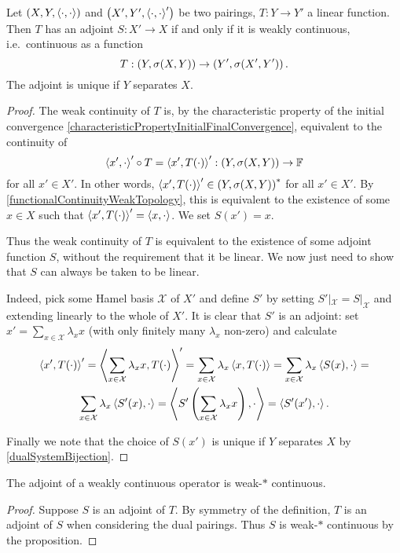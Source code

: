\begin{proposition}
Let $\left( X,Y,\left\langle \cdot,\cdot \right\rangle \right)$ and $\left( X',Y',\left\langle \cdot,\cdot \right\rangle' \right)$ be two pairings, $T: Y\to Y'$ a linear function. Then $T$ has an adjoint $S: X'\to X$ \textup{if and only if} it is weakly continuous, i.e.\ continuous as a function
\[ T: \left( Y, \sigma(X,Y) \right) \to \left( Y', \sigma(X',Y') \right). \]
The adjoint is unique if $Y$ separates $X$.
\end{proposition}
\begin{proof}
The weak continuity of $T$ is, by the characteristic property of the initial convergence \ref{characteristicPropertyInitialFinalConvergence}, equivalent to the continuity of
\[ \left\langle x', \cdot \right\rangle' \circ T = \left\langle x', T(\cdot) \right\rangle' : \left( Y, \sigma(X,Y) \right) \to \mathbb{F} \]
for all $x'\in X'$. In other words, $\left\langle x', T(\cdot) \right\rangle' \in {\left( Y, \sigma(X,Y) \right)}^*$ for all $x'\in X'$. By \ref{functionalContinuityWeakTopology}, this is equivalent to the existence of some $x\in X$ such that $\left\langle x', T(\cdot) \right\rangle' = \left\langle x,\cdot \right\rangle$. We set $S(x') = x$.

Thus the weak continuity of $T$ is equivalent to the existence of some adjoint function $S$, without the requirement that it be linear. We now just need to show that $S$ can always be taken to be linear.

Indeed, pick some Hamel basis $\mathcal{X}$ of $X'$ and define $S'$ by setting $S'|_{\mathcal{X}} = S|_{\mathcal{X}}$ and extending linearly to the whole of $X'$. It is clear that $S'$ is an adjoint: set $x' = \sum_{x\in\mathcal{X}}\lambda_x x$ (with only finitely many $\lambda_x$ non-zero) and calculate
\begin{multline*}
\left\langle x', T(\cdot) \right\rangle' = \left\langle \sum_{x\in\mathcal{X}}\lambda_x x, T(\cdot) \right\rangle' = \sum_{x\in\mathcal{X}}\lambda_x \left\langle x, T(\cdot) \right\rangle = \sum_{x\in\mathcal{X}}\lambda_x \left\langle S(x), \cdot \right\rangle = \\ \sum_{x\in\mathcal{X}}\lambda_x \left\langle S'(x), \cdot \right\rangle = \left\langle S'\left(\sum_{x\in\mathcal{X}}\lambda_x x\right), \cdot \right\rangle = \left\langle S'(x'), \cdot \right\rangle.
\end{multline*}

Finally we note that the choice of $S(x')$ is unique if $Y$ separates $X$ by \ref{dualSystemBijection}.
\end{proof}
\begin{corollary}
The adjoint of a weakly continuous operator is weak-$*$ continuous.
\end{corollary}
\begin{proof}
Suppose $S$ is an adjoint of $T$. By symmetry of the definition, $T$ is an adjoint of $S$ when considering the dual pairings. Thus $S$ is weak-$*$ continuous by the proposition.
\end{proof}

